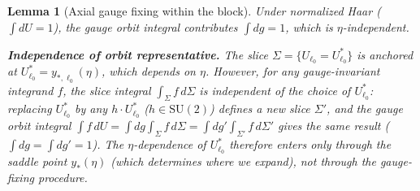 \documentclass[11pt]{article}
\newtheorem{lemma}[theorem]{Lemma}
\theoremstyle{definition}
\newcommand{\SU}{\mathrm{SU}}
\begin{document}
\begin{lemma}[Axial gauge fixing within the block]
Under normalized Haar ($\int dU=1$), the gauge orbit integral
contributes $\int dg=1$, which is $\eta$-independent.

\textbf{Independence of orbit representative.}
The slice $\Sigma=\{U_{\ell_0}=U_{\ell_0}^*\}$ is anchored at
$U_{\ell_0}^*=y_{*,\ell_0}(\eta)$, which depends on $\eta$.
However, for any gauge-invariant integrand $f$, the slice integral
$\int_\Sigma f\,d\Sigma$ is independent of the choice of
$U_{\ell_0}^*$: replacing $U_{\ell_0}^*$ by any $h\cdot U_{\ell_0}^*$
($h\in\SU(2)$) defines a new slice $\Sigma'$, and the gauge orbit
integral $\int f\,dU=\int dg\int_\Sigma f\,d\Sigma
=\int dg'\int_{\Sigma'} f\,d\Sigma'$ gives the same result
($\int dg=\int dg'=1$).  The $\eta$-dependence of $U_{\ell_0}^*$
therefore enters only through the saddle point $y_*(\eta)$ (which
determines where we expand), not through the gauge-fixing procedure.
\end{lemma}
\end{document}
